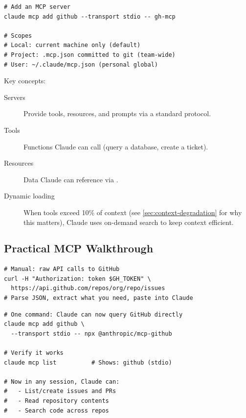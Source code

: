 

\begin{verbatim}
# Add an MCP server
claude mcp add github --transport stdio -- gh-mcp

# Scopes
# Local: current machine only (default)
# Project: .mcp.json committed to git (team-wide)
# User: ~/.claude/mcp.json (personal global)
\end{verbatim}

Key concepts:
\begin{description}
  \item[Servers] Provide tools, resources, and prompts via a standard protocol.
  \item[Tools] Functions Claude can call (query a database, create a ticket).
  \item[Resources] Data Claude can reference via .
  \item[Dynamic loading] When tools exceed 10\% of context
    (see \cref{sec:context-degradation} for why this matters),
    Claude uses on-demand search to keep context efficient.
\end{description}

\subsection{Practical MCP Walkthrough}

\begin{fullwidth}
\begin{beforeafter}
\before
\begin{verbatim}
# Manual: raw API calls to GitHub
curl -H "Authorization: token $GH_TOKEN" \
  https://api.github.com/repos/org/repo/issues
# Parse JSON, extract what you need, paste into Claude
\end{verbatim}

\after
\begin{verbatim}
# One command: Claude can now query GitHub directly
claude mcp add github \
  --transport stdio -- npx @anthropic/mcp-github

# Verify it works
claude mcp list          # Shows: github (stdio)

# Now in any session, Claude can:
#   - List/create issues and PRs
#   - Read repository contents
#   - Search code across repos
\end{verbatim}
\end{beforeafter}
\end{fullwidth}

